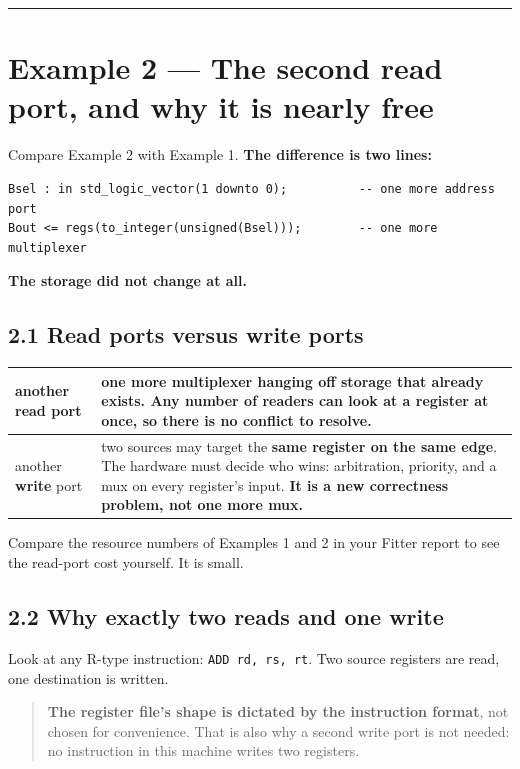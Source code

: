 \documentclass[11pt]{article}
\newcommand{\code}[1]{\texttt{#1}}
\newcommand{\hr}{\vspace{2pt}\hrule\vspace{6pt}}
\begin{document}
\vspace{4pt}\hr

\section*{Example 2 --- The second read port, and why it is nearly free}

Compare Example 2 with Example 1. \textbf{The difference is two lines:}

\begin{lstlisting}
Bsel : in std_logic_vector(1 downto 0);          -- one more address port
Bout <= regs(to_integer(unsigned(Bsel)));        -- one more multiplexer
\end{lstlisting}

\textbf{The storage did not change at all.}

\subsection*{2.1 Read ports versus write ports}

\begin{center}
\small
\begin{tabular}{l>{\raggedright\arraybackslash}p{11.0cm}}
\toprule
another \textbf{read} port & one more multiplexer hanging off storage that already exists. Any number of readers can look at a register at once, so there is no conflict to resolve. \\
\midrule
another \textbf{write} port & two sources may target the \textbf{same register on the same edge}. The hardware must decide who wins: arbitration, priority, and a mux on every register's input. \textbf{It is a new correctness problem, not one more mux.} \\
\bottomrule
\end{tabular}
\end{center}

Compare the resource numbers of Examples 1 and 2 in your Fitter report to see the
read-port cost yourself. It is small.

\subsection*{2.2 Why exactly two reads and one write}

Look at any R-type instruction: \code{ADD rd, rs, rt}. Two source registers are
read, one destination is written.

\begin{quote}
\textbf{The register file's shape is dictated by the instruction format}, not
chosen for convenience. That is also why a second write port is not needed: no
instruction in this machine writes two registers.
\end{quote}
\end{document}
